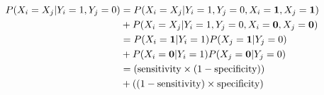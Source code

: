 \documentclass[article]{jss}
\begin{document}
\begin{align*}
P(X_{i} = X_{j} | Y_{i} = 1, Y_{j} = 0) &= P(X_{i} = X_{j} | Y_{i} = 1, Y_{j} = 0, X_{i} = {\bf 1}, X_{j} = {\bf 1}) \\
&+ P(X_{i} = X_{j} | Y_{i} = 1, Y_{j} = 0, X_{i} = {\bf 0}, X_{j} = {\bf 0}) \\
&= P(X_{i} = {\bf 1} | Y_{i} = 1) P(X_{j} = {\bf 1} | Y_{j} = 0) \\
&+ P(X_{i} = {\bf 0} | Y_{i} = 1) P(X_{j} = {\bf 0} | Y_{j} = 0) \\
&= \left(\text{sensitivity} \times (1 - \text{specificity})\right) \\
&+ \left((1- \text{sensitivity}) \times \text{specificity}\right)
\end{align*}


\end{document}
